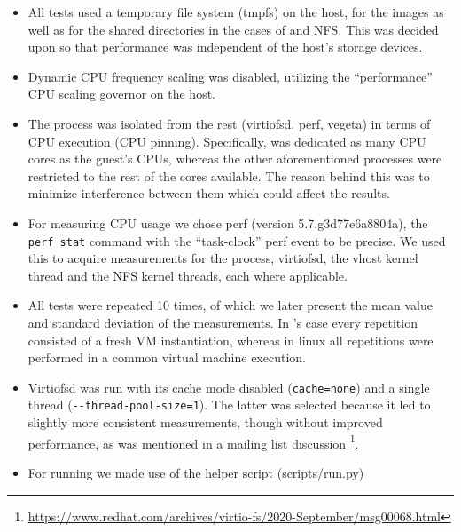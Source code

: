 \begin{itemize}
    \item All tests used a temporary file system (tmpfs) %
          on the host, for the \osv{} images as well as for the shared
          directories in the cases of \viofs{} and NFS. This was decided upon so
          that performance was independent of the host's storage devices.
    \item Dynamic CPU frequency scaling was disabled, utilizing the
          ``performance'' CPU scaling governor %
          on the host.
    \item The \qemu{} process was isolated from the rest (virtiofsd, perf,
          vegeta) in terms of CPU execution (CPU pinning). %
          Specifically, \qemu{} was dedicated as many CPU cores as the guest's
          CPUs, whereas the other aforementioned processes were restricted to
          the rest of the cores available. The reason behind this was to
          minimize interference between them which could affect the results.
    \item For measuring CPU usage we chose perf \cite{perf} (version
          5.7.g3d77e6a8804a), the \texttt{perf stat} command with the
          ``task-clock'' perf event to be precise. We used this to acquire
          measurements for the \qemu{} process, virtiofsd, the vhost kernel
          thread \cite{stefanha:vhost} and the NFS kernel threads, each where
          applicable.
    \item All tests were repeated 10 times, of which we later present the
          mean value and standard deviation of the measurements. In \osv{}'s
          case every repetition consisted of a fresh VM instantiation, whereas
          in linux all repetitions were performed in a common virtual machine
          execution.
    \item Virtiofsd was run with its cache mode disabled (\texttt{cache=none})
          and a single thread (\texttt{-{}-thread-pool-size=1}). The latter was
          selected because it led to slightly more consistent measurements,
          though without improved performance, as was mentioned in a \viofs{}
          mailing list discussion%
          \footnote{\url{https://www.redhat.com/archives/virtio-fs/2020-September/msg00068.html}}.
    \item For running \osv{} we made use of the helper script (scripts/run.py)

\end{itemize}
